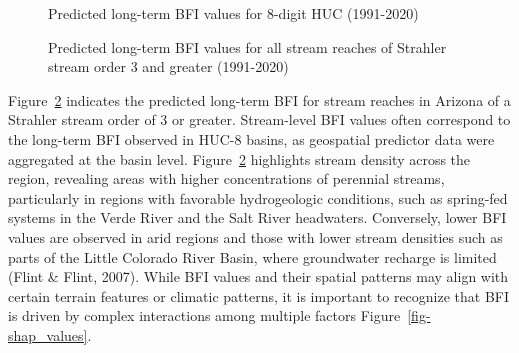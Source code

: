 \documentclass[
]{agujournal2019}
\begin{document}
\begin{figure}


\caption{\label{fig-bfi-huc}Predicted long-term BFI values for 8-digit
HUC (1991-2020)}

\end{figure}%

\begin{figure}


\caption{\label{fig-bfi-streams}Predicted long-term BFI values for all
stream reaches of Strahler stream order 3 and greater (1991-2020)}

\end{figure}%

Figure~\ref{fig-bfi-streams} indicates the predicted long-term BFI for
stream reaches in Arizona of a Strahler stream order of 3 or greater.
Stream-level BFI values often correspond to the long-term BFI observed
in HUC-8 basins, as geospatial predictor data were aggregated at the
basin level. Figure~\ref{fig-bfi-streams} highlights stream density
across the region, revealing areas with higher concentrations of
perennial streams, particularly in regions with favorable hydrogeologic
conditions, such as spring-fed systems in the Verde River and the Salt
River headwaters. Conversely, lower BFI values are observed in arid
regions and those with lower stream densities such as parts of the
Little Colorado River Basin, where groundwater recharge is limited
(Flint \& Flint, 2007). While BFI values and their spatial patterns may
align with certain terrain features or climatic patterns, it is
important to recognize that BFI is driven by complex interactions among
multiple factors Figure~\ref{fig-shap_values}.
\end{document}
